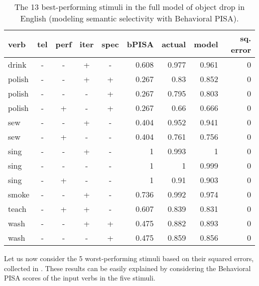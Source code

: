 \begin{table}[htb] %
\caption{The 13 best-performing stimuli in the full model of object drop in English (modeling semantic selectivity with Behavioral PISA).}
\begin{tabular}{l|ccccr|rrr}
\textbf{verb}  & \textbf{tel} & \textbf{perf} & \textbf{iter} & \textbf{spec} & \textbf{bPISA}   & \textbf{actual} & \textbf{model} & \textbf{sq. error} \\
\hline
drink  & -  & -   & +   & -     & 0.608 & 0.977  & 0.961     & 0             \\
polish & -  & -   & +   & +     & 0.267 & 0.83   & 0.852     & 0             \\
polish & -  & -   & -   & +     & 0.267 & 0.795  & 0.803     & 0             \\
polish & -  & +   & -   & +     & 0.267 & 0.66   & 0.666     & 0             \\
sew    & -  & -   & +   & -     & 0.404 & 0.952  & 0.941     & 0             \\
sew    & -  & +   & -   & -     & 0.404 & 0.761  & 0.756     & 0             \\
sing   & -  & -   & +   & -     & 1     & 0.993  & 1         & 0             \\
sing   & -  & -   & -   & -     & 1     & 1      & 0.999     & 0             \\
sing   & -  & +   & -   & -     & 1     & 0.91   & 0.903     & 0             \\
smoke  & -  & -   & +   & -     & 0.736 & 0.992  & 0.974     & 0             \\
teach  & -  & +   & +   & -     & 0.607 & 0.839  & 0.831     & 0             \\
wash   & -  & -   & +   & +     & 0.475 & 0.882  & 0.893     & 0             \\
wash   & -  & -   & -   & +     & 0.475 & 0.859  & 0.856     & 0            
\end{tabular}
\end{table}

Let us now consider the 5 worst-performing stimuli based on their squared errors, collected in . These results can be easily explained by considering the Behavioral PISA scores of the input verbs in the five stimuli.


